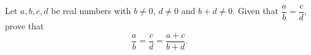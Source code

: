 Let $a,b,c,d$ be real numbers with $b\ne0$, $d\ne0$ and $b+d\ne0$. Given that $\dfrac {a}{b}=\dfrac {c}{d}$, prove that
\[
\dfrac {a}{b}=\dfrac {c}{d}=\dfrac{a+c}{b+d}.
\]
